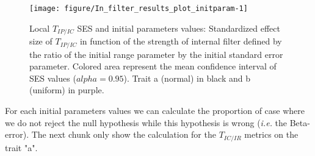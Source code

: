 \documentclass[12pt]{article}\usepackage[]{graphicx}\usepackage[]{color}
\newenvironment{knitrout}{}{} %
\begin{document}
\begin{knitrout}
\begin{figure}
{\centering \texttt{[image: figure/In\_filter\_results\_plot\_initparam-1]} 

}

\caption[Local $T_{IP/IC}$ SES and initial parameters values]{Local $T_{IP/IC}$ SES and initial parameters values: Standardized effect size of $T_{IP/IC}$ in function of the strength of internal filter defined by the ratio of the initial range parameter by the initial standard error parameter. Colored area represent the mean confidence interval of SES values ($alpha = 0.95$). Trait a (normal) in black and b (uniform) in purple.\label{fig:In_filter_results_plot_initparam}}
\end{figure}


\end{knitrout}
 
  
For each initial parameters values we can calculate the proportion of case where we do not reject the null hypothesis while this hypothesis is wrong (\textit{i.e.} the Beta-error). The next chunk only show the calculation for the $T_{IC/IR}$ metrics on the trait "a".
\end{document}
